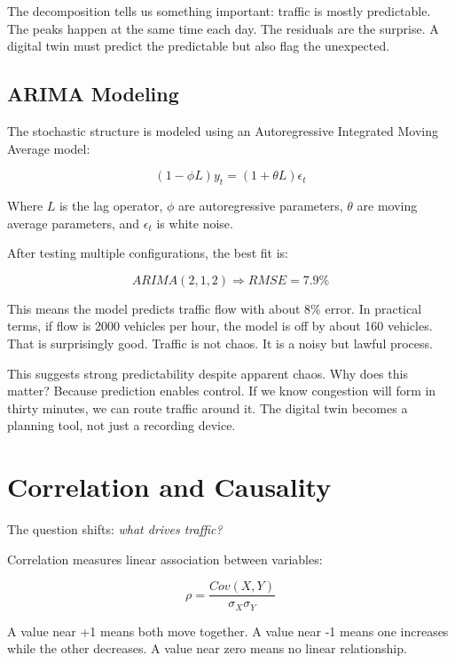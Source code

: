 \documentclass[12pt]{article}
\begin{document}
The decomposition tells us something important: traffic is mostly predictable. The peaks happen at the same time each day. The residuals are the surprise. A digital twin must predict the predictable but also flag the unexpected.

\subsection{ARIMA Modeling}

The stochastic structure is modeled using an Autoregressive Integrated Moving Average model:

\begin{equation}
(1 - \phi L)y_t = (1 + \theta L)\epsilon_t
\end{equation}

Where \(L\) is the lag operator, \(\phi\) are autoregressive parameters, \(\theta\) are moving average parameters, and \(\epsilon_t\) is white noise.

After testing multiple configurations, the best fit is:

\[
ARIMA(2,1,2) \Rightarrow RMSE = 7.9\%
\]

This means the model predicts traffic flow with about 8\% error. In practical terms, if flow is 2000 vehicles per hour, the model is off by about 160 vehicles. That is surprisingly good. Traffic is not chaos. It is a noisy but lawful process.

This suggests strong predictability despite apparent chaos. Why does this matter? Because prediction enables control. If we know congestion will form in thirty minutes, we can route traffic around it. The digital twin becomes a planning tool, not just a recording device.

\section{Correlation and Causality}

The question shifts: \textit{what drives traffic?}

Correlation measures linear association between variables:

\begin{equation}
\rho = \frac{Cov(X,Y)}{\sigma_X \sigma_Y}
\end{equation}

A value near +1 means both move together. A value near -1 means one increases while the other decreases. A value near zero means no linear relationship.
\end{document}
